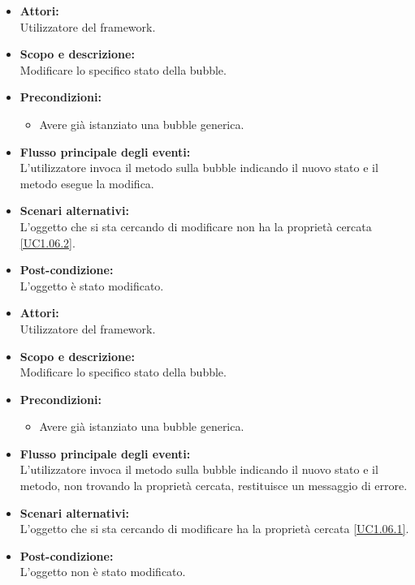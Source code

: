 \begin{itemize}
	\item \textbf{Attori:}
	\\Utilizzatore del framework.
	\item \textbf{Scopo e descrizione:} 
	\\Modificare lo specifico stato della bubble.
	\item \textbf{Precondizioni:}
	\begin{itemize}
		\item Avere già istanziato una bubble generica.
	\end{itemize}
	\item \textbf{Flusso principale degli eventi:}
	\\L'utilizzatore invoca il metodo sulla bubble indicando il nuovo stato e il metodo esegue la modifica.
	\item \textbf{Scenari alternativi:}
	\\L'oggetto che si sta cercando di modificare non ha la proprietà cercata \ref{UC1.06.2}.
	\item \textbf{Post-condizione:}
	\\L'oggetto è stato modificato.
\end{itemize}


\begin{itemize}
	\item \textbf{Attori:}
	\\Utilizzatore del framework.
	\item \textbf{Scopo e descrizione:} 
	\\Modificare lo specifico stato della bubble.
	\item \textbf{Precondizioni:}
	\begin{itemize}
		\item Avere già istanziato una bubble generica.
	\end{itemize}
	\item \textbf{Flusso principale degli eventi:}
	\\L'utilizzatore invoca il metodo sulla bubble indicando il nuovo stato e il metodo, non trovando la proprietà cercata, restituisce un messaggio di errore.
	\item \textbf{Scenari alternativi:}
	\\L'oggetto che si sta cercando di modificare ha la proprietà cercata \ref{UC1.06.1}.
	\item \textbf{Post-condizione:}
	\\L'oggetto non è stato modificato.
\end{itemize}

